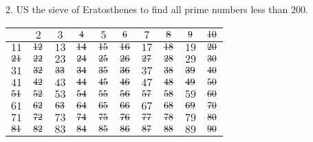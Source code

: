 \newpage
\begin{mdframed}[style=darkQuesion]
2. US the sieve of Eratosthenes to find all prime numbers less than 200.
\end{mdframed}

\begin{mdframed}[style=darkAnswer,frametitle={Joe Starr}]
    \begin{center}
        \begin{tabular}{| c | c | c | c | c | c | c | c | c | c |}
        \hline
        $ $ & $2$ & $3$ & $\msout{4}$ & $5$ & $\msout{6}$ & $7$ & $\msout{8}$ & $\msout{9}$ & $\msout{10}$ \\
        \hline
        $11$ & $\msout{12}$ & $13$ & $\msout{14}$ & $\msout{15}$ & $\msout{16}$ & $17$ & $\msout{18}$ & $19$ & $\msout{20}$ \\
        \hline
        $\msout{21}$ & $\msout{22}$ & $23$ & $\msout{24}$ & $\msout{25}$ & $\msout{26}$ & $\msout{27}$ & $\msout{28}$ & $29$ & $\msout{30}$ \\
        \hline
        $31$ & $\msout{32}$ & $\msout{33}$ & $\msout{34}$ & $\msout{35}$ & $\msout{36}$ & $37$ & $\msout{38}$ & $\msout{39}$ & $\msout{40}$ \\
        \hline
        $41$ & $\msout{42}$ & $43$ & $\msout{44}$ & $\msout{45}$ & $\msout{46}$ & $47$ & $\msout{48}$ & $\msout{49}$ & $\msout{50}$ \\
        \hline
        $\msout{51}$ & $\msout{52}$ & $53$ & $\msout{54}$ & $\msout{55}$ & $\msout{56}$ & $\msout{57}$ & $\msout{58}$ & $59$ & $\msout{60}$ \\
        \hline
        $61$ & $\msout{62}$ & $\msout{63}$ & $\msout{64}$ & $\msout{65}$ & $\msout{66}$ & $67$ & $\msout{68}$ & $\msout{69}$ & $\msout{70}$ \\
        \hline
        $71$ & $\msout{72}$ & $73$ & $\msout{74}$ & $\msout{75}$ & $\msout{76}$ & $\msout{77}$ & $\msout{78}$ & $79$ & $\msout{80}$ \\
        \hline
        $\msout{81}$ & $\msout{82}$ & $83$ & $\msout{84}$ & $\msout{85}$ & $\msout{86}$ & $\msout{87}$ & $\msout{88}$ & $89$ & $\msout{90}$ \\

\end{tabular}
\end{center}
\end{mdframed}
